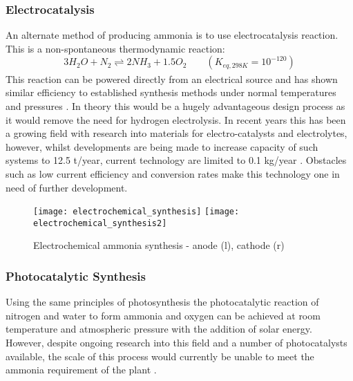 \subsubsection{Electrocatalysis}
An alternate method of producing ammonia is to use electrocatalysis reaction. This is a non-spontaneous thermodynamic reaction:
\begin{equation}
3H_2O+N_2   \underset{ }{\stackrel{ }{\rightleftharpoons}}   2NH_3 + 1.5O_2 \qquad (K_{eq,298K} = 10^{-120})
\end{equation}	
This reaction can be powered directly from an electrical source and has shown similar efficiency to established synthesis methods under normal temperatures and pressures \cite{Liu2014}. In theory this would be a hugely advantageous design process as it would remove the need for hydrogen electrolysis. In recent years this has been a growing field with research into materials for electro-catalysts and electrolytes, however, whilst developments are being made to increase capacity of such systems to 12.5 t/year, current technology are limited to 0.1 kg/year \cite{Gellett2016}. Obstacles such as low current efficiency and conversion rates make this technology one in need of further development. %
{\begin{figure}[h]
		\centering
		
		{\centering
			
			\texttt{[image: electrochemical\_synthesis]}
			\texttt{[image: electrochemical\_synthesis2]}	
			\caption{Electrochemical ammonia synthesis - anode (l), cathode (r)  \cite{Kyriakou2017}}
	}
\end{figure}}



\subsubsection{Photocatalytic Synthesis}
Using the same principles of photosynthesis the photocatalytic reaction of nitrogen and water to form ammonia and oxygen can be achieved at room temperature and atmospheric pressure with the addition of solar energy. However, despite ongoing research into this field and a number of photocatalysts available, the scale of this process would currently be unable to meet the ammonia requirement of the plant \cite{Liu2014}.

